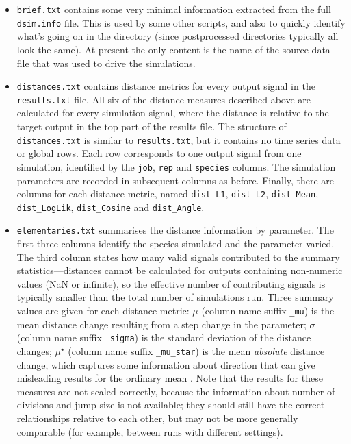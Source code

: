 \documentclass[a4paper,11pt]{article}
\begin{document}
\begin{itemize}
\item \texttt{brief.txt} contains some very minimal information extracted from the full \texttt{dsim.info} file. This is used by some other scripts, and also to quickly identify what's going on in the directory (since postprocessed directories typically all look the same). At present the only content is the name of the source data file that was used to drive the simulations.
\item \texttt{distances.txt} contains distance metrics for every output signal in the \texttt{results.txt} file. All six of the distance measures described above are calculated for every simulation signal, where the distance is relative to the target output in the top part of the results file. The structure of \texttt{distances.txt} is similar to \texttt{results.txt}, but it contains no time series data or global rows. Each row corresponds to one output signal from one simulation, identified by the \texttt{job}, \texttt{rep} and \texttt{species} columns. The simulation parameters are recorded in subsequent columns as before. Finally, there are columns for each distance metric, named \texttt{dist\_L1}, \texttt{dist\_L2}, \texttt{dist\_Mean}, \texttt{dist\_LogLik}, \texttt{dist\_Cosine} and \texttt{dist\_Angle}.
\item \texttt{elementaries.txt} summarises the distance information by parameter. The first three columns identify the species simulated and the parameter varied. The third column states how many valid signals contributed to the summary statistics---distances cannot be calculated for outputs containing non-numeric values (NaN or infinite), so the effective number of contributing signals is typically smaller than the total number of simulations run. Three summary values are given for each distance metric: $\mu$ (column name suffix \texttt{\_mu}) is the mean distance change resulting from a step change in the parameter; $\sigma$ (column name suffix \texttt{\_sigma}) is the standard deviation of the distance changes; $\mu^{\star}$ (column name suffix \texttt{\_mu\_star}) is the mean \textit{absolute} distance change, which captures some information about direction that can give misleading results for the ordinary mean \citep{Campolongo:2007cv}. Note that the results for these measures are not scaled correctly, because the information about number of divisions and jump size is not available; they should still have the correct relationships relative to each other, but may not be more generally comparable (for example, between runs with different settings).
\end{itemize}
\end{document}
